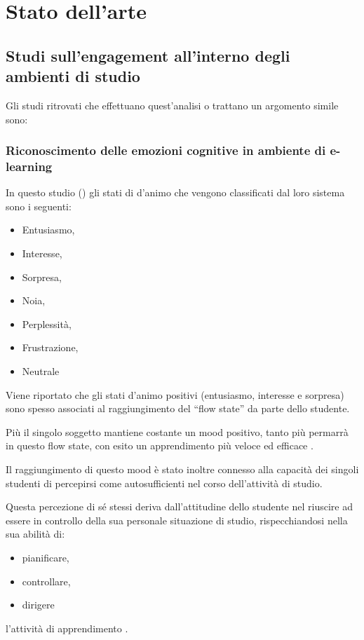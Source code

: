 \chapter{Stato dell'arte}

\section{Studi sull’engagement all’interno degli ambienti di studio}
Gli studi ritrovati che effettuano quest’analisi o trattano un argomento simile sono:
\subsection{Riconoscimento delle emozioni cognitive in ambiente di e-learning}
In questo studio (\cite{RecoCognEmoELearnEnv}) gli stati di d’animo che vengono classificati dal loro sistema sono i seguenti:
\begin{itemize}
    \item Entusiasmo,
    \item Interesse,
    \item Sorpresa,
    \item Noia,
    \item Perplessità,
    \item Frustrazione,
    \item Neutrale
\end{itemize}

Viene riportato che gli stati d’animo positivi (entusiasmo, interesse e sorpresa) sono spesso associati al raggiungimento del “flow state” da parte dello studente.

Più il singolo soggetto mantiene costante un mood positivo, tanto più permarrà in questo flow state, con esito un apprendimento più veloce ed efficace \cite{RecoCognEmoELearnEnv}.

Il raggiungimento di questo mood è stato inoltre connesso alla capacità dei singoli studenti di percepirsi come autosufficienti nel corso dell’attività di studio.

Questa percezione di sé stessi deriva dall’attitudine dello studente nel riuscire ad essere in controllo della sua personale situazione di studio, rispecchiandosi nella sua abilità di:
\begin{itemize}
    \item pianificare,
    \item controllare,
    \item dirigere
\end{itemize}
l’attività di apprendimento \cite{RecoCognEmoELearnEnv}.


